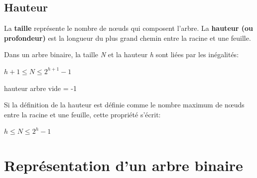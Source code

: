 \documentclass[a4paper,11pt]{article}
\begin{document}
\begin{Form}
\subsection{Hauteur}
La \textbf{taille} représente le nombre de nœuds qui composent l'arbre. La \textbf{hauteur (ou profondeur)} est la longueur du plus grand chemin entre la racine et une feuille.
\begin{aretenir}[]
Dans un arbre binaire, la taille \emph{N} et la hauteur \emph{h} sont liées par les inégalités:
\begin{center}
$h+1 \leqslant N \leqslant 2^{h+1}-1$
\end{center}
\end{aretenir}
\begin{commentprof}
hauteur arbre vide = -1
\end{commentprof}
\begin{aretenir}[Remarque]
Si la définition de la hauteur est définie comme le nombre maximum de nœuds entre la racine et une feuille, cette propriété s'écrit:
\begin{center}
$h \leqslant N \leqslant 2^{h}-1$
\end{center}
\end{aretenir}

\section{Représentation d'un arbre binaire}
\end{Form}
\end{document}
